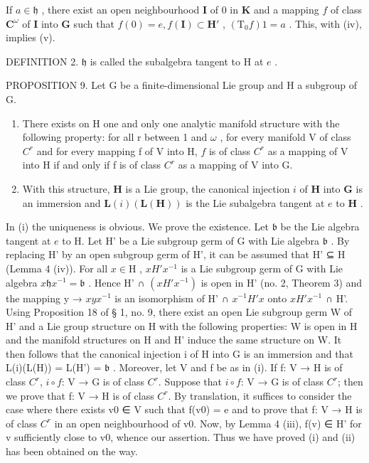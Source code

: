 If \(a \in \mathfrak{h}\) , there exist an open neighbourhood \(\mathbf{I}\) of 0 in \(\mathbf{K}\) and a mapping \(f\) of class \(\mathbf{C}^{\omega}\) of \(\mathbf{I}\) into \(\mathbf{G}\) such that \(f(0) = e, f(\mathbf{I}) \subset \mathbf{H}'\) , \((\mathrm{T}_0f)1 = a\) . This, with (iv), implies (v).

DEFINITION 2. \(\mathfrak{h}\) is called the subalgebra tangent to H at \(e\) .

PROPOSITION 9. Let G be a finite-dimensional Lie group and H a subgroup of G.

\begin{enumerate}
\def\labelenumi{(\roman{enumi})}
\item
  There exists on H one and only one analytic manifold structure with the following property: for all r between 1 and \(\omega\) , for every manifold V of class \(C^r\) and for every mapping f of V into H, \(f\) is of class \(C^r\) as a mapping of V into H if and only if f is of class \(C^r\) as a mapping of V into G.
\item
  With this structure, \(\mathbf{H}\) is a Lie group, the canonical injection \(i\) of \(\mathbf{H}\) into \(\mathbf{G}\) is an immersion and \(\mathbf{L}(i)(\mathbf{L}(\mathbf{H}))\) is the Lie subalgebra tangent at \(e\) to \(\mathbf{H}\) .
\end{enumerate}

In (i) the uniqueness is obvious. We prove the existence. Let \(\mathfrak{b}\) be the Lie algebra tangent at \(e\) to H. Let H' be a Lie subgroup germ of G with Lie algebra \(\mathfrak{b}\) . By replacing H' by an open subgroup germ of H', it can be assumed that H' ⊆ H (Lemma 4 (iv)). For all \(x \in \mathrm{H}\) , \(xH'x^{-1}\) is a Lie subgroup germ of G with Lie algebra \(x \mathfrak{h}x^{-1} = \mathfrak{b}\) . Hence H' ∩ \((xH'x^{-1})\) is open in H' (no. 2, Theorem 3) and the mapping y → \(xyx^{-1}\) is an isomorphism of H' ∩ \(x^{-1}H'x\) onto \(xH'x^{-1}\) ∩ H'. Using Proposition 18 of § 1, no. 9, there exist an open Lie subgroup germ W of H' and a Lie group structure on H with the following properties: W is open in H and the manifold structures on H and H' induce the same structure on W. It then follows that the canonical injection i of H into G is an immersion and that L(i)(L(H)) = L(H') = \(\mathfrak{b}\) . Moreover, let V and f be as in (i). If f: V → H is of class \(C^r\), \(i \circ f\): V → G is of class \(C^r\). Suppose that \(i \circ f\): V → G is of class \(C^r\); then we prove that f: V → H is of class \(C^r\). By translation, it suffices to consider the case where there exists v0 ∈ V such that f(v0) = e and to prove that f: V → H is of class \(C^r\) in an open neighbourhood of v0. Now, by Lemma 4 (iii), f(v) ∈ H' for v sufficiently close to v0, whence our assertion. Thus we have proved (i) and (ii) has been obtained on the way.

